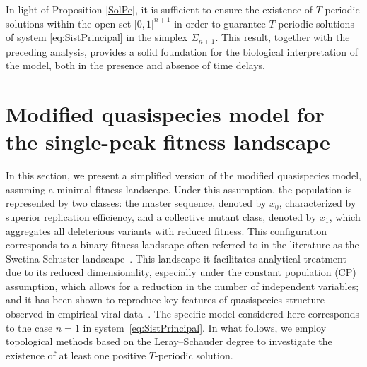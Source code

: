 \documentclass[11pt,reqno]{amsart}
\theoremstyle{definition}
\begin{document}
In light of Proposition \ref{SolPe}, it is sufficient to ensure the existence of $T$-periodic solutions within the open set $]0,1[^{n+1}$ in order to guarantee $T$-periodic solutions of system \eqref{eq:SistPrincipal} in the simplex $\Sigma_{n+1}$. This result, together with the preceding analysis, provides a solid foundation for the biological interpretation of the model, both in the presence and absence of time delays.


\section{Modified quasispecies model for the single-peak fitness landscape}\label{sec:results}
In this section, we present a simplified version of the modified quasispecies model, assuming a minimal fitness landscape. Under this assumption, the population is represented by two classes: the master sequence, denoted by $x_0$, characterized by superior replication efficiency, and a collective mutant class, denoted by $x_1$, which aggregates all deleterious variants with reduced fitness. This configuration corresponds to a binary fitness landscape often referred to in the literature as the Swetina-Schuster landscape~\cite{Swetina1982,Sole2003}. This landscape it facilitates analytical treatment due to its reduced dimensionality, especially under the constant population (CP) assumption, which allows for a reduction in the number of independent variables; and it has been shown to reproduce key features of quasispecies structure observed in empirical viral data~\cite{Sole2006}. The specific model considered here corresponds to the case $n = 1$ in system~\eqref{eq:SistPrincipal}.
In what follows, we employ topological methods based on the Leray–Schauder degree to investigate the existence of at least one positive $T$-periodic solution.
\end{document}
